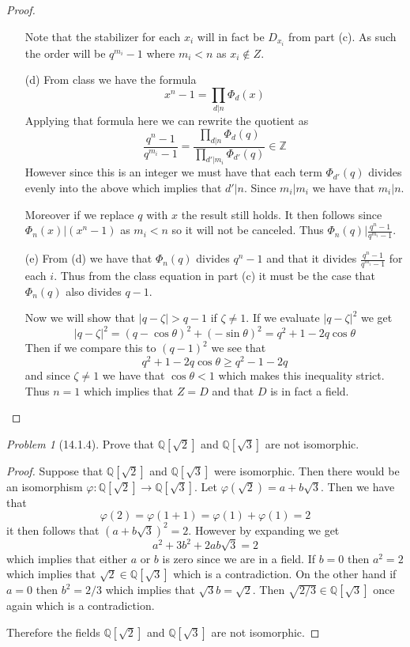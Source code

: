 \documentclass[10pt]{article}
\newcommand{\sk}{\vskip 10mm}
\newcommand{\bb}[1]{\mathbb{#1}}
\theoremstyle{remark}
\newtheorem{problem}{Problem}
\theoremstyle{remark}
\begin{document}
\begin{proof}
\begin{enumerate}
    Note that the stabilizer for each $x_i$ will in fact be $D_{x_i}$ from
    part (c). As such the order will be $q^{m_i}-1$ where $m_i<n$ as $x_i\notin Z$.
  \item[(d)] From class we have the formula
    \[
      x^n-1 = \prod_{d|n}\Phi_d(x)
    \]
    Applying that formula here we can rewrite the quotient as
    \[
      \frac{q^n-1}{q^{m_i}-1}=\frac{\prod_{d|n}\Phi_d(q)}{\prod_{d'|m_i}\Phi_{d'}(q)}\in\bb{Z}
    \]
    However since this is an integer we must have that each term $\Phi_{d'}(q)$
    divides evenly into the above which implies that $d'|n$. Since
    $m_i|m_i$ we have that $m_i|n$.

    Moreover if we replace $q$ with $x$ the result still holds. It then
    follows since $\Phi_n(x)|(x^n-1)$ as $m_i<n$ so it will not be canceled.
    Thus $\Phi_n(q)|\frac{q^n-1}{q^{m_i}-1}$.
  \item[(e)] From (d) we have that $\Phi_n(q)$ divides $q^n-1$ and
    that it divides $\frac{q^n-1}{q^{m_i}-1}$ for each $i$. Thus
    from the class equation in part (c) it must be the
    case that $\Phi_n(q)$ also divides $q-1$.

    Now we will show that $|q-\zeta|>q-1$ if $\zeta\neq 1$. If we evaluate
    $|q-\zeta|^2$ we get
    \[
      |q-\zeta|^2 = (q-\cos\theta)^2+(-\sin\theta)^2=q^2+1-2q\cos\theta 
    \]
    Then if we compare this to $(q-1)^2$ we see that
    \[
      q^2+1-2q\cos\theta\geq q^2-1-2q
    \]
    and since $\zeta\neq 1$ we have that $\cos\theta<1$ which makes this inequality
    strict. Thus $n=1$ which implies that $Z=D$ and that $D$ is in fact
    a field.
  \end{enumerate}
\end{proof}

\sk

\begin{problem}[14.1.4]
  Prove that $\bb{Q}[\sqrt{2}]$ and $\bb{Q}[\sqrt{3}]$ are not isomorphic.
\end{problem}

\begin{proof}
  Suppose that $\bb{Q}[\sqrt{2}]$ and $\bb{Q}[\sqrt{3}]$ were isomorphic.
  Then there would be an isomorphism $\varphi:\bb{Q}[\sqrt{2}]\rightarrow\bb{Q}[\sqrt{3}]$.
  Let $\varphi(\sqrt{2})=a+b\sqrt{3}$. Then we have that
  \[ \varphi(2)=\varphi(1+1)=\varphi(1)+\varphi(1)=2\]
  it then follows that $(a+b\sqrt{3})^2=2$. However by expanding we get
  \[ a^2+3b^2+2ab\sqrt{3}=2 \]
  which implies that either $a$ or $b$ is zero since we are in a field.
  If $b=0$ then $a^2=2$ which implies that $\sqrt{2}\in\bb{Q}[\sqrt{3}]$ which is
  a contradiction. On the other hand if $a=0$ then $b^2=2/3$ which
  implies that $\sqrt{3}b=\sqrt{2}$. Then $\sqrt{2/3}\in\bb{Q}[\sqrt{3}]$
  once again which is a contradiction.

  Therefore the fields $\bb{Q}[\sqrt{2}]$ and $\bb{Q}[\sqrt{3}]$ are
  not isomorphic.
\end{proof}
\end{document}
